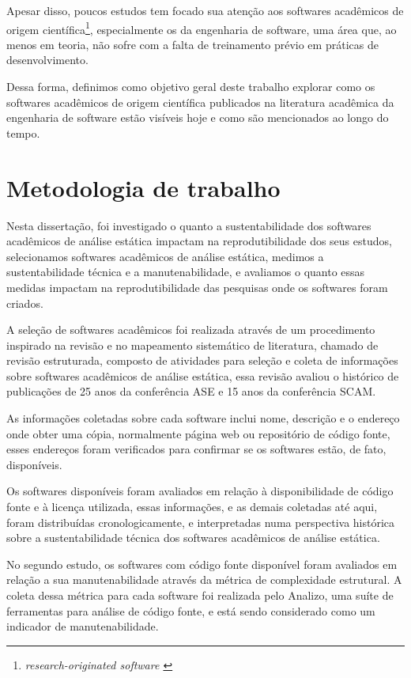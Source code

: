 Apesar disso, poucos estudos tem focado sua atenção aos softwares acadêmicos de
origem científica\footnote{\it research-originated software \cite{Kon2011}},
especialmente os da engenharia de software, uma área que, ao menos em teoria,
não sofre com a falta de treinamento prévio em práticas de desenvolvimento.

Dessa forma, definimos como objetivo geral deste trabalho explorar como os
softwares acadêmicos de origem científica publicados na literatura acadêmica da
engenharia de software estão visíveis hoje e como são mencionados ao longo do
tempo.

\section{Metodologia de trabalho}

Nesta dissertação, foi investigado o quanto a sustentabilidade dos softwares
acadêmicos de análise estática impactam na reprodutibilidade dos seus estudos,
selecionamos softwares acadêmicos de análise estática, medimos a
sustentabilidade técnica e a manutenabilidade, e avaliamos o quanto essas medidas
impactam na reprodutibilidade das pesquisas onde os softwares foram criados.

A seleção de softwares acadêmicos foi realizada através de um procedimento
inspirado na revisão e no mapeamento sistemático de literatura, chamado de
revisão estruturada, composto de atividades para seleção e coleta de
informações sobre softwares acadêmicos de análise estática, essa revisão
avaliou o histórico de publicações de 25 anos da conferência ASE e 15 anos da
conferência SCAM.

As informações coletadas sobre cada software inclui nome, descrição e o
endereço onde obter uma cópia, normalmente página web ou repositório de código
fonte, esses endereços foram verificados para confirmar se os softwares estão,
de fato, disponíveis.

Os softwares disponíveis foram avaliados em relação à disponibilidade de código
fonte e à licença utilizada, essas informações, e as demais coletadas até aqui,
foram distribuídas cronologicamente, e interpretadas numa perspectiva histórica
sobre a sustentabilidade técnica dos softwares acadêmicos de análise estática.

No segundo estudo, os softwares com código fonte disponível foram avaliados em
relação a sua manutenabilidade através da métrica de complexidade estrutural. A
coleta dessa métrica para cada software foi realizada pelo Analizo, uma suíte
de ferramentas para análise de código fonte, e está sendo considerado como um
indicador de manutenabilidade.

